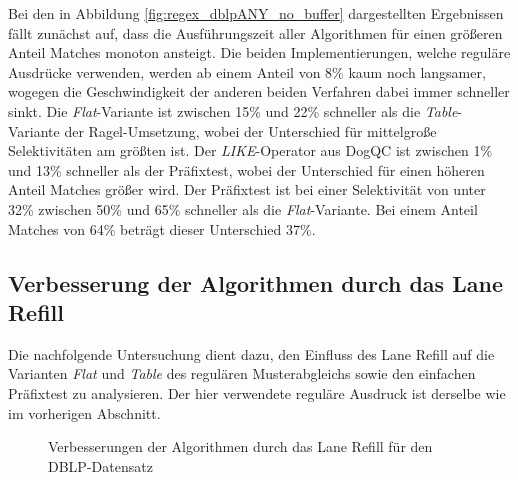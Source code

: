 Bei den in Abbildung \ref{fig:regex_dblpANY_no_buffer} dargestellten Ergebnissen fällt zunächst auf, dass die Ausführungszeit aller Algorithmen für einen größeren Anteil Matches monoton ansteigt.
Die beiden Implementierungen, welche reguläre Ausdrücke verwenden, werden ab einem Anteil von 8\% kaum noch langsamer, wogegen die Geschwindigkeit der anderen beiden Verfahren dabei immer schneller sinkt.
Die \emph{Flat}-Variante ist zwischen 15\% und 22\% schneller als die \emph{Table}-Variante der Ragel-Umsetzung, wobei der Unterschied für mittelgroße Selektivitäten am größten ist.
Der \emph{LIKE}-Operator aus DogQC ist zwischen 1\% und 13\% schneller als der Präfixtest, wobei der Unterschied für einen höheren Anteil Matches größer wird.
Der Präfixtest ist bei einer Selektivität von unter 32\% zwischen 50\% und 65\% schneller als die \emph{Flat}-Variante.
Bei einem Anteil Matches von 64\% beträgt dieser Unterschied 37\%.

\subsection{Verbesserung der Algorithmen durch das Lane Refill}
\label{sec:regex_evaluation_beobachtung_2}

Die nachfolgende Untersuchung dient dazu, den Einfluss des Lane Refill auf die Varianten \emph{Flat} und \emph{Table} des regulären Musterabgleichs sowie den einfachen Präfixtest zu analysieren.
Der hier verwendete reguläre Ausdruck ist derselbe wie im vorherigen Abschnitt.

\begin{figure}[ht]
	\centering
	\caption{Verbesserungen der Algorithmen durch das Lane Refill für den DBLP-Datensatz}
	\label{fig:regex_dblpANY_buffer}
\end{figure}

